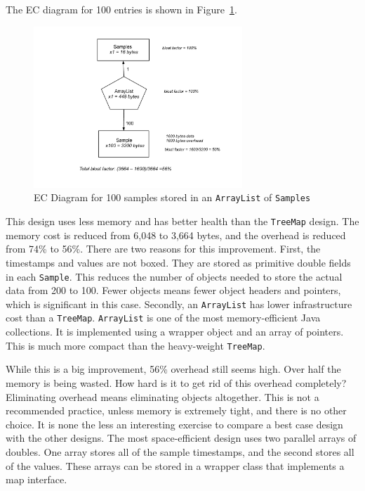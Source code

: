 The EC diagram for 100 entries is shown in Figure~\ref{fig:content-schematic-arraylist-pairs}.
\begin{figure}
  \centering
 \includegraphics[width=0.7\textwidth]{Figures/chapter3/arraylist-doubles}
  \caption{EC Diagram for 100 samples stored in an \texttt{ArrayList} of \texttt{Samples}}
  \label{fig:content-schematic-arraylist-pairs}
\end{figure} 
This design uses less memory and has better health than the \texttt{TreeMap} design. The memory cost is reduced from 6,048 to 3,664 bytes, and the overhead is reduced from 74\% to 56\%.  There are two reasons for this improvement. First, the timestamps and values are not boxed. They are stored as primitive double fields in each \texttt{Sample}. This reduces the number of objects needed to store the actual data from 200 to 100. Fewer objects means fewer object headers and pointers, which is significant in this case. Secondly, an \texttt{ArrayList} has lower infrastructure cost than a \texttt{TreeMap}. \texttt{ArrayList} is one of the most memory-efficient Java collections. It is implemented using a wrapper object and an array of pointers. This is much more compact than the heavy-weight \texttt{TreeMap}. 

While this is a big improvement, 56\% overhead still seems high. Over half the memory is being wasted. How hard is it to get rid of this overhead completely? Eliminating overhead means eliminating objects altogether. This is not a recommended practice, unless memory is extremely tight, and there is no other choice. It is none the less an interesting exercise to compare a best case design with the other designs. The most space-efficient design uses two parallel arrays of doubles. One array stores all of the sample timestamps, and the second stores all of the values. These arrays can be stored in a wrapper class that implements a map interface.

